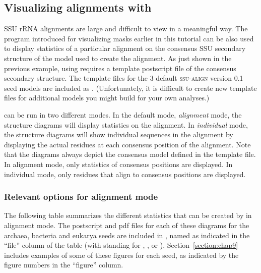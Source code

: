 \subsection{Visualizing alignments with }

SSU rRNA alignments are large and difficult to view in a meaningful
way. The  program introduced for visualizing masks
earlier in this tutorial can be also used to display statistics of
a particular alignment on the consensus SSU secondary structure of the
model used to create the alignment. As just shown in the previous example,
using  requires a template postscript file of the
consensus secondary structure. The template files for the 3 default
\textsc{ssu-align} version 0.1 seed models are included as
. 
(Unfortunately, it is difficult to create new template files for
additional models you might build for your own analyses.) 

 can be run in two different modes. In the default
mode, \emph{alignment} mode, the structure diagrams will display
statistics on the alignment. In \emph{individual} mode, the structure
diagrams will show individual sequences in the alignment by displaying
the actual residues at each consensus position of the alignment. Note
that the diagrams always depict the consensus model defined in the
template file. In alignment mode, only statistics of consensus
positions are displayed. In individual mode, only residues that align to
consensus positions are displayed.

\subsubsection{Relevant options for alignment mode}

The following table summarizes the different statistics that can be
created by  in alignment mode.
The postscript and pdf files for each of
these diagrams for the archaea, bacteria and eukarya seeds
are included in  , named as
indicated  in the ``file'' column of the table (with 
standing for , , or ). 
Section~\ref{section:chap9} includes examples of some of these
figures for each seed, as indicated by the figure numbers in 
the ``figure'' column. 

